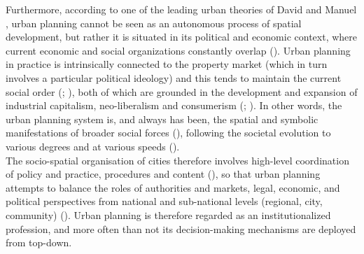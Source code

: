 \documentclass[11pt]{report}
\begin{document}
{{{Furthermore, according to one of the leading urban theories of David \href{Harvey}{\cite{harvey_right_2008}} and Manuel \href{Castells}{\cite{castells_urban_1979}}, urban planning cannot be seen as an autonomous process of spatial development, but rather it is situated in its political and economic context, where current economic and social organizations constantly overlap (\href{Taylor}{\citealt{taylor_urban_2006}}).
Urban planning in practice is intrinsically connected to the property market (which in turn involves a particular political ideology) and this tends to maintain the current social order (\href{Dear}{\citealt{dear_urbanization_1981}}; \href{Taylor}{\citealt{taylor_urban_2006}}), both of which are grounded in the development and expansion of industrial capitalism, neo-liberalism and consumerism (\href{Ellin}{\citealt{ellin_postmodern_1999}}; \href{Harvey}{\citealt{harvey_urban_1989}}).
In other words, the urban planning system is, and always has been, the spatial and symbolic manifestations of broader social forces  (\href{Giddens}{\citealt{giddens_consequences_1992}}), following the societal evolution to various degrees and at various speeds (\href{Flyvbjerg}{\cite{Flyvbjerg, 1998}}).
\\

The socio-spatial organisation of cities therefore involves high-level coordination of policy and practice, procedures and content (\href{Van}{\cite{(Van Assche and Verschraegen, 2008}}), so that urban planning attempts to balance the roles of authorities and markets, legal, economic, and political perspectives from national and sub-national levels (regional, city, community) (\href{Nedovic}{\citealt{nedovic-budic_mornings_2011}}).
Urban planning is therefore regarded as an institutionalized profession, and more often than not its decision-making mechanisms are deployed from top-down.
\\

}}}
\end{document}

